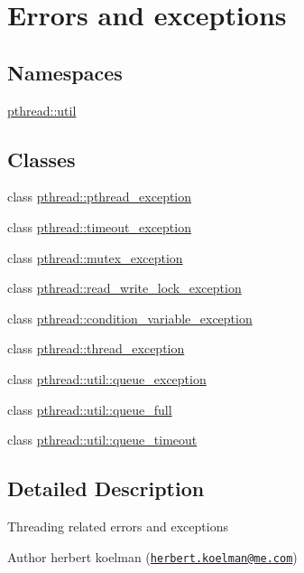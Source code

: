 \hypertarget{group__exception}{\section{Errors and exceptions}
\label{group__exception}
}
\subsection*{Namespaces}
\begin{DoxyCompactItemize}
\item 
 \hyperlink{namespacepthread_1_1util}{pthread\+::util}
\end{DoxyCompactItemize}
\subsection*{Classes}
\begin{DoxyCompactItemize}
\item 
class \hyperlink{classpthread_1_1pthread__exception}{pthread\+::pthread\+\_\+exception}
\item 
class \hyperlink{classpthread_1_1timeout__exception}{pthread\+::timeout\+\_\+exception}
\item 
class \hyperlink{classpthread_1_1mutex__exception}{pthread\+::mutex\+\_\+exception}
\item 
class \hyperlink{classpthread_1_1read__write__lock__exception}{pthread\+::read\+\_\+write\+\_\+lock\+\_\+exception}
\item 
class \hyperlink{classpthread_1_1condition__variable__exception}{pthread\+::condition\+\_\+variable\+\_\+exception}
\item 
class \hyperlink{classpthread_1_1thread__exception}{pthread\+::thread\+\_\+exception}
\item 
class \hyperlink{classpthread_1_1util_1_1queue__exception}{pthread\+::util\+::queue\+\_\+exception}
\item 
class \hyperlink{classpthread_1_1util_1_1queue__full}{pthread\+::util\+::queue\+\_\+full}
\item 
class \hyperlink{classpthread_1_1util_1_1queue__timeout}{pthread\+::util\+::queue\+\_\+timeout}
\end{DoxyCompactItemize}


\subsection{Detailed Description}
Threading related errors and exceptions \begin{DoxyAuthor}{Author}
herbert koelman (\href{mailto:herbert.koelman@me.com}{\tt herbert.\+koelman@me.\+com}) 
\end{DoxyAuthor}
